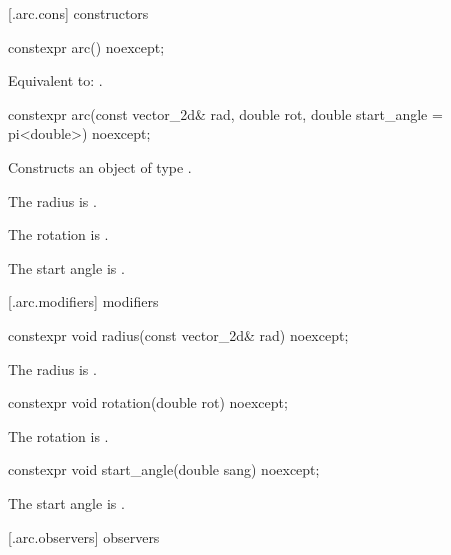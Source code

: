  [\iotwod.arc.cons] { constructors}%

%
\begin{itemdecl}
constexpr arc() noexcept;
\end{itemdecl}
\begin{itemdescr}
\pnum
\effects
Equivalent to: .
\end{itemdescr}

%
\begin{itemdecl}
constexpr arc(const vector_2d& rad, double rot,
  double start_angle = pi<double>) noexcept;
\end{itemdecl}
\begin{itemdescr}
\pnum
\effects
Constructs an object of type .

\pnum
The radius is .

\pnum
The rotation is .

\pnum
The start angle is .
\end{itemdescr}

 [\iotwod.arc.modifiers]{ modifiers}%

%
\begin{itemdecl}
constexpr void radius(const vector_2d& rad) noexcept;
\end{itemdecl}
\begin{itemdescr}
\pnum
\effects
The radius is .
\end{itemdescr}

%
\begin{itemdecl}
constexpr void rotation(double rot) noexcept;
\end{itemdecl}
\begin{itemdescr}
\pnum
\effects
The rotation is .
\end{itemdescr}

%
\begin{itemdecl}
constexpr void start_angle(double sang) noexcept;
\end{itemdecl}
\begin{itemdescr}
\pnum
\effects
The start angle is .
\end{itemdescr}

 [\iotwod.arc.observers]{ observers}%

